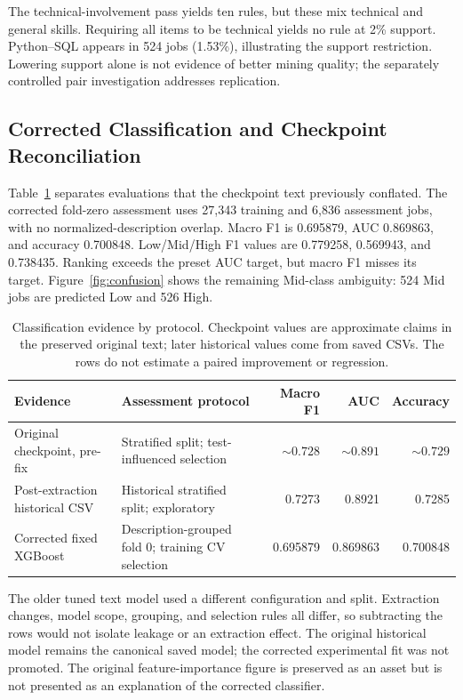 \documentclass[sigconf,nonacm]{acmart}
\begin{document}
The technical-involvement pass yields ten rules, but these mix technical and general skills. Requiring all items to be technical yields no rule at 2\% support. Python--SQL appears in 524 jobs (1.53\%), illustrating the support restriction. Lowering support alone is not evidence of better mining quality; the separately controlled pair investigation addresses replication.

\subsection{Corrected Classification and Checkpoint Reconciliation}
Table~\ref{tab:classification} separates evaluations that the checkpoint text previously conflated. The corrected fold-zero assessment uses 27,343 training and 6,836 assessment jobs, with no normalized-description overlap. Macro F1 is 0.695879, AUC 0.869863, and accuracy 0.700848. Low/Mid/High F1 values are 0.779258, 0.569943, and 0.738435. Ranking exceeds the preset AUC target, but macro F1 misses its target. Figure~\ref{fig:confusion} shows the remaining Mid-class ambiguity: 524 Mid jobs are predicted Low and 526 High.

\begin{table}[t]
\caption{Classification evidence by protocol. Checkpoint values are approximate claims in the preserved original text; later historical values come from saved CSVs. The rows do not estimate a paired improvement or regression.}
\label{tab:classification}
\centering\small
\begin{tabular}{p{}p{}rrr}
\toprule
Evidence & Assessment protocol & Macro F1 & AUC & Accuracy \\
\midrule
Original checkpoint, pre-fix & Stratified split; test-influenced selection & $\sim0.728$ & $\sim0.891$ & $\sim0.729$ \\
Post-extraction historical CSV & Historical stratified split; exploratory & 0.7273 & 0.8921 & 0.7285 \\
Corrected fixed XGBoost & Description-grouped fold 0; training CV selection & 0.695879 & 0.869863 & 0.700848 \\
\bottomrule
\end{tabular}
\end{table}

The older tuned text model used a different configuration and split. Extraction changes, model scope, grouping, and selection rules all differ, so subtracting the rows would not isolate leakage or an extraction effect. The original historical model remains the canonical saved model; the corrected experimental fit was not promoted. The original feature-importance figure is preserved as an asset but is not presented as an explanation of the corrected classifier.
\end{document}

